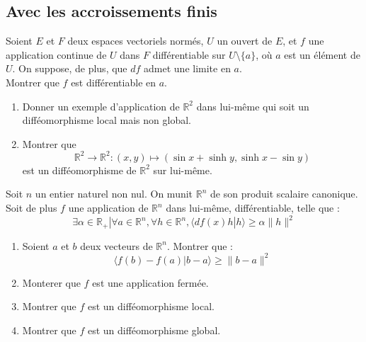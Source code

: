 
\subsection{Avec les accroissements finis}

\begin{exer}
Soient $E$ et $F$ deux espaces vectoriels normés, $U$ un ouvert de $E$, %
et $f$ une application continue de $U$ dans $F$ différentiable sur $U \setminus \{ a \}$, où $a$ est un élément de $U$. %
On suppose, de plus, que $df$ admet une limite en $a$.\\
Montrer que $f$ est différentiable en $a$.
\end{exer}

\begin{exer}
\begin{enumerate}
\item Donner un exemple d'application de $\mathbb{R}^2$ dans lui-même qui soit un difféomorphisme local mais non global.
\item Montrer que \[\mathbb{R}^2 \rightarrow \mathbb{R}^2 : (x,y) \mapsto (\sin x + \sinh y, \sinh x - \sin y)\]
est un difféomorphisme de $\mathbb{R}^2$ sur lui-même.
\end{enumerate}
\end{exer}

\begin{exer}
Soit $n$ un entier naturel non nul. On munit $\mathbb{R}^n$ de son produit scalaire canonique. %
Soit de plus $f$ une application de $\mathbb{R}^n$ dans lui-même, différentiable, telle que :
\[\exists \alpha \in \mathbb{R}_+ | \forall a \in \mathbb{R}^n , \forall h \in \mathbb{R}^n , \langle df(x)h | h \rangle \geq \alpha \| h \|^2\]
\begin{enumerate}
\item Soient $a$ et $b$ deux vecteurs de $\mathbb{R}^n$. Montrer que :
\[\langle f(b)-f(a) | b-a \rangle \geq \| b-a \|^2\]
\item Monterer que $f$ est une application fermée.
\item Montrer que $f$ est un difféomorphisme local.
\item Montrer que $f$ est un difféomorphisme global.
\end{enumerate}
\end{exer}

